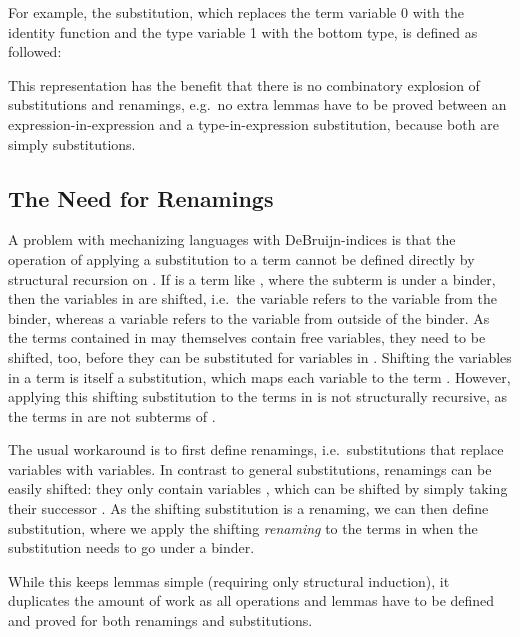 \documentclass[sigplan,10pt, anonymous]{acmart}
\newenvironment{ExampleCode*}{%
  \begin{tcolorbox}[%
    colframe=white,%
    colback=yellow!5,%
    boxrule=0.0pt,%
    top=2.5pt,%
    left=2.5pt,%
    bottom=2.5pt,%
    right=2.5pt,%
    boxsep=0pt%
  ]\vspace{-0.2\baselineskip}%
}{%
  \vspace{-1\baselineskip}%
  \end{tcolorbox}%
}
\newcommand*\ExampleCode[1]{\begin{ExampleCode*}{#1}\end{ExampleCode*}}
\newcommand*\ACode[1]{\AgdaFontStyle{\textcolor{mygray}{#1}}}
\newcommand*\ACon[1]{\AgdaInductiveConstructor{#1}}
\begin{document}
  For example, the substitution, which replaces the term variable 0 with the
  identity function and the type variable 1 with the bottom type, is defined
  as followed:
  \ExampleCode\FExampleSub

  This representation has the benefit that there is no combinatory
  explosion of substitutions and renamings, e.g.\ no extra lemmas have to be
  proved between an expression-in-expression and a type-in-expression
  substitution, because both are simply substitutions.

  \subsection{The Need for Renamings}
  A problem with mechanizing languages with DeBruijn-indices is that
  the operation of applying a substitution \ACode{σ} to a term
  \ACode{t} cannot be defined directly by structural recursion on
  \ACode{t}.
  If \ACode{t} is a term like \ACode{\ACon{λx} e},
  where the subterm \ACode{e} is under a binder, then the variables
  in \ACode{e} are shifted, i.e.\ the variable \ACode{\ACon{zero}} refers
  to the variable from the binder, whereas a variable \ACode{\ACon{suc} x}
  refers to the variable \ACode{x} from outside of the binder.
  As the terms contained in \ACode{σ} may themselves contain free variables,
  they need to be shifted, too, before they can be substituted
  for variables in \ACode{e}. 
  Shifting the variables in a term is itself a substitution, which maps
  each variable \ACode{x} to the term \ACode{\ACon{`} (\ACon{suc} x)}.
  However, applying this shifting substitution to the terms in
  \ACode{σ} is not structurally recursive, as the terms in \ACode{σ}
  are not subterms of \ACode{\ACon{λx} e}.

  The usual workaround is to first define renamings,
  i.e.\ substitutions that replace variables with variables.
  In contrast to general substitutions, renamings can be easily
  shifted: they only contain variables \ACode{x}, which can be
  shifted by simply taking their successor \ACode{\ACon{suc} x}.
  As the shifting substitution is a renaming, we can then define substitution,
  where we apply the shifting \emph{renaming} to the terms in \ACode{σ} when
  the substitution needs to go under a binder.

  While this keeps lemmas simple (requiring only structural induction),
  it duplicates the amount of work as all operations and lemmas have
  to be defined and proved for both renamings and substitutions.
\end{document}
